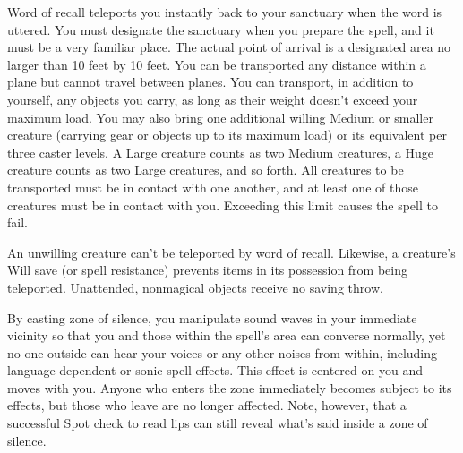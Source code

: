 \begin{multicols}{2}
\begin{small}
\noindent Word of recall teleports you instantly back to your sanctuary when the word is uttered. You must designate the sanctuary when you prepare the spell, and it must be a very familiar place. The actual point of arrival is a designated area no larger than 10 feet by 10 feet. You can be transported any distance within a plane but cannot travel between planes. You can transport, in addition to yourself, any objects you carry, as long as their weight doesn't exceed your maximum load. You may also bring one additional willing Medium or smaller creature (carrying gear or objects up to its maximum load) or its equivalent per three caster levels. A Large creature counts as two Medium creatures, a Huge creature counts as two Large creatures, and so forth. All creatures to be transported must be in contact with one another, and at least one of those creatures must be in contact with you. Exceeding this limit causes the spell to fail.

\smallskip\noindent An unwilling creature can't be teleported by word of recall. Likewise, a creature's Will save (or spell resistance) prevents items in its possession from being teleported. Unattended, nonmagical objects receive no saving throw.

\noindent By casting zone of silence, you manipulate sound waves in your immediate vicinity so that you and those within the spell's area can converse normally, yet no one outside can hear your voices or any other noises from within, including language-dependent or sonic spell effects. This effect is centered on you and moves with you. Anyone who enters the zone immediately becomes subject to its effects, but those who leave are no longer affected. Note, however, that a successful Spot check to read lips can still reveal what's said inside a zone of silence.


\end{small}
\end{multicols}
